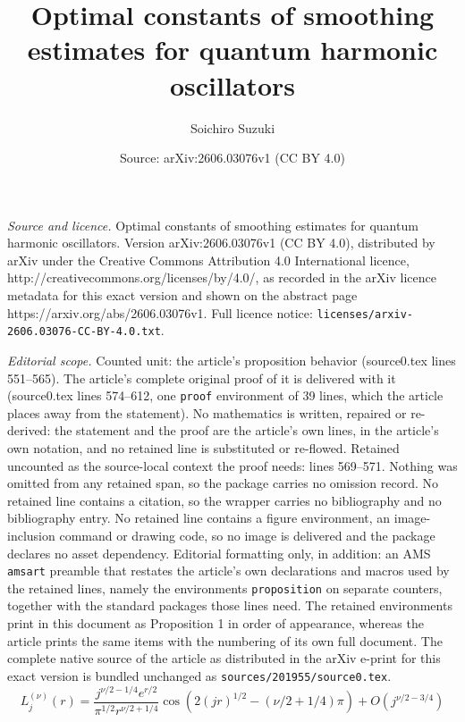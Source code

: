 \documentclass[10pt,a4paper]{amsart}
\title{Optimal constants of smoothing estimates for quantum harmonic oscillators}
\author{Soichiro Suzuki}
\date{Source: arXiv:2606.03076v1 (CC BY 4.0)}
\newcommand{\LaguerreL}[2]{L_{#1}^{(#2)}}
\begin{document}
\maketitle

\noindent\emph{Source and licence.} Optimal constants of smoothing estimates for quantum harmonic oscillators. Version arXiv:2606.03076v1 (CC BY 4.0), distributed by arXiv under the Creative Commons Attribution 4.0 International licence, http://creativecommons.org/licenses/by/4.0/, as recorded in the arXiv licence metadata for this exact version and shown on the abstract page https://arxiv.org/abs/2606.03076v1. Full licence notice: \texttt{licenses/arxiv-2606.03076-CC-BY-4.0.txt}.\par\smallskip

\noindent\textit{Editorial scope.} Counted unit: the article's proposition behavior (source0.tex lines 551--565). The article's complete original proof of it is delivered with it (source0.tex lines 574--612, one \texttt{proof} environment of 39 lines, which the article places away from the statement). No mathematics is written, repaired or re-derived: the statement and the proof are the article's own lines, in the article's own notation, and no retained line is substituted or re-flowed.  Retained uncounted as the source-local context the proof needs: lines 569--571.  Nothing was omitted from any retained span, so the package carries no omission record.  No retained line contains a citation, so the wrapper carries no bibliography and no bibliography entry.  No retained line contains a figure environment, an image-inclusion command or drawing code, so no image is delivered and the package declares no asset dependency.  Editorial formatting only, in addition: an AMS \texttt{amsart} preamble that restates the article's own declarations and macros used by the retained lines, namely the environments \texttt{proposition} on separate counters, together with the standard packages those lines need.  The retained environments print in this document as Proposition 1 in order of appearance, whereas the article prints the same items with the numbering of its own full document.  The complete native source of the article as distributed in the arXiv e-print for this exact version is bundled unchanged as \texttt{sources/201955/source0.tex}.
	\begin{equation} \label{eq:asymptotic behavior for Laguerre polynomial}
		\LaguerreL{j}{\nu}(r) = \frac{j^{\nu/2-1/4} e^{r/2}}{\pi^{1/2} r^{\nu/2+1/4}} \cos{ (2(jr)^{1/2} - (\nu/2+1/4)\pi )} + O(j^{\nu/2-3/4})
	\end{equation}
\end{document}
